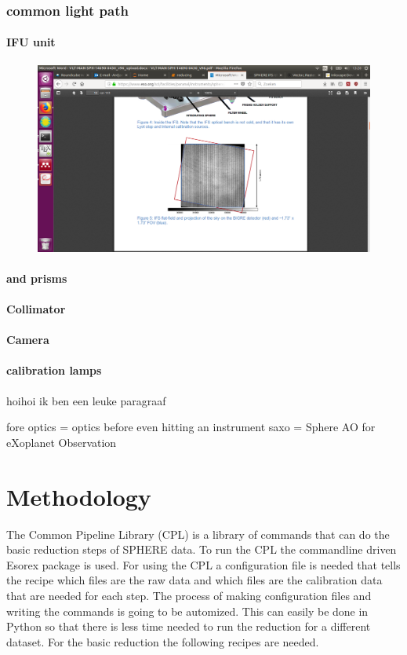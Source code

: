 \documentclass[twoside,single]{lion-msc}
\begin{document}
\subsection{common light path}


\subsubsection{IFU unit}

\begin{figure}[htbp]
\centering 
\includegraphics[trim={15cm 5.5cm 10cm 9.5cm},clip,scale = 0.47]{biggre}
\caption{} 
\label{}
\end{figure}

\subsubsection{and prisms}
\subsubsection{Collimator}
\subsubsection{Camera}
\subsubsection{calibration lamps} 
hoihoi ik ben een leuke paragraaf

fore optics = optics before even hitting an instrument
saxo = Sphere AO for eXoplanet Observation

\chapter{Methodology}
The Common Pipeline Library (CPL) is a library of commands that can do the basic reduction steps of SPHERE data. To run the CPL the commandline driven Esorex package is used. For using the CPL a configuration file is needed that tells the recipe which files are the raw data and which files are the calibration data that are needed for each step. The process of making configuration files and writing the commands is going to be automized. This can easily be done in Python so that there is less time needed to run the reduction for a different dataset. For the basic reduction the following recipes are needed.
\end{document}
